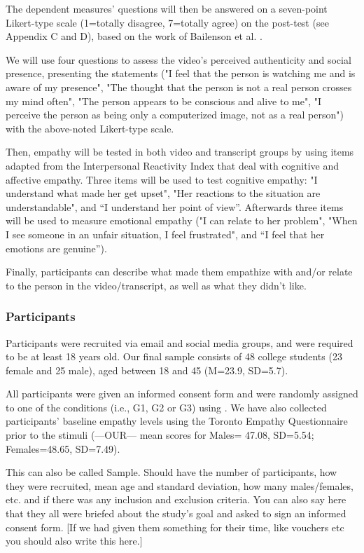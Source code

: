 The dependent measures' questions will then be answered on a seven-point Likert-type scale (1=totally disagree, 7=totally agree) on the post-test (see Appendix C and D), based on the work of Bailenson et al. \cite{BAI03}.

We will use four questions to assess the video's perceived authenticity and social presence, presenting the statements ("I feel that the person is watching me and is aware of my presence", "The thought that the person is not a real person crosses my mind often", "The person appears to be conscious and alive to me", "I perceive the person as being only a computerized image, not as a real person") with the above-noted Likert-type scale.

Then, empathy will be tested in both video and transcript groups by using items adapted from the Interpersonal Reactivity Index \cite{DAV83} that deal with cognitive and affective empathy. Three items will be used to test cognitive empathy: "I understand what made her get upset", "Her reactions to the situation are understandable", and “I understand her point of view”. Afterwards three items will be used to measure emotional empathy ("I can relate to her problem", "When I see someone in an unfair situation, I feel frustrated", and “I feel that her emotions are genuine”).

Finally, participants can describe what made them empathize with and/or relate to the person in the video/transcript, as well as what they didn't like.

\subsubsection{Participants}
Participants were recruited via email and social media groups, and were required to be at least 18 years old. Our final sample consists of 48 college students (23 female and 25 male), aged between 18 and 45 (M=23.9, SD=5.7). 

All participants were given an informed consent form and were randomly assigned to one of the conditions (i.e., G1, G2 or G3) using \cite{ALLOCATE.MONSTER}. We have also collected participants' baseline empathy levels using the Toronto Empathy Questionnaire \cite{} prior to the stimuli (---OUR--- mean scores for Males= 47.08, SD=5.54; Females=48.65, SD=7.49).


This can also be called Sample. Should have the number of participants, how they were recruited, mean age and standard deviation, how many males/females, etc. and if there was any inclusion and exclusion criteria.
You can also say here that they all were briefed about the study's goal and asked to sign an informed consent form. [If we had given them something for their time, like vouchers etc you should also write this here.]

